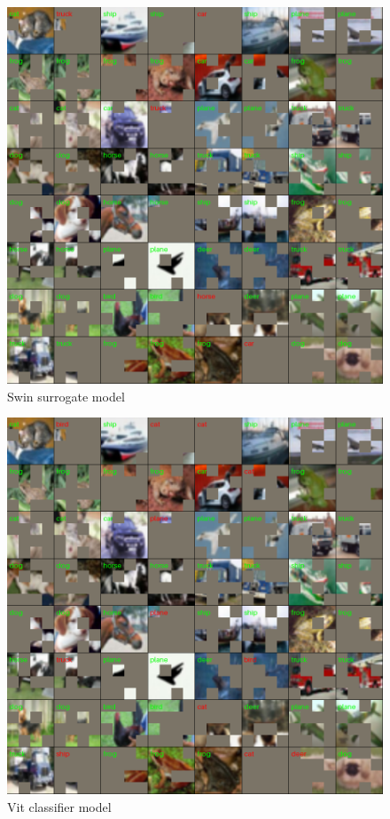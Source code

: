 \documentclass[magisterska,en]{pracamgr}
\begin{document}
\begin{figure}[H]
\centering
\includegraphics[scale=0.5]{./images/swin_surrogate_masks.png}
\caption{Swin surrogate model}
\label{swin_surrogate_masks}
\end{figure}






\begin{figure}[H]
\centering
\includegraphics[scale=0.5]{./images/vit_classifier_masks.png}
\caption{Vit classifier model}
\label{vit_classifier_masks}
\end{figure}
\end{document}
